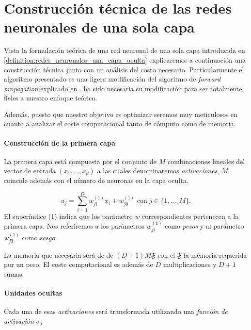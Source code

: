 %

\chapter{Construcción técnica de las redes neuronales de una sola capa}  

Vista la formulación teórica de una red neuronal de una sola capa 
introducida en \ref{definition:redes_neuronales_una_capa_oculta} explicaremos a continuación  una construcción técnica junto con un
análisis del costo necesario.
 Particularmente el algoritmo presentado es una ligera modificación del algoritmo de    
\textit{forward propagation} explicado en \cite{BishopPaterRecognition}, ha sido necesaria su modificación para ser totalmente fieles a nuestro enfoque teórico. 

Además, puesto que nuestro objetivo es optimizar seremos muy meticulosos en cuanto a analizar el coste computacional tanto de cómputo como de memoria.


\subsubsection*{Construcción de la primera capa}
La primera capa está compuesta por el conjunto de $M$ combinaciones
lineales del vector de entrada $(x_1, \ldots, x_d)$
a las cuales denominaremos \textit{activaciones}, $M$ coincide además
con el número de neuronas en la capa oculta. 

\begin{equation}
    a_j = \sum_{i=1}^D w_{ji}^{(1)} x_i + w_{j0}^{(1)}
    \text{ con } j \in \{1, \ldots, M \}.
\end{equation}
El superíndice (1) indica que los parámetro $w$ correspondientes pertenecen a la primera capa. 
Nos referiremos a los  parámetros $w_{ji}^{(1)}$ como 
\textit{pesos} y al parámetro $w_{j0}^{(1)}$ como 
\textit{sesgo}.  

La memoria que necesaria será de de $(D+1)M \mathfrak{F}$ 
con el $\mathfrak{F}$ la memoria requerida por un peso. 
El coste computacional es además de $D$ multiplicaciones 
y $D+1$ sumas.

\subsubsection*{Unidades ocultas}
Cada una de esas \textit{activaciones} será transformada
utilizando una \textit{función de activación} $\sigma_j$ 

